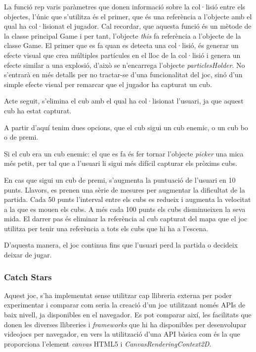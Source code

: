 \documentclass[12pt,a4paper,catalan]{article}
\begin{document}
	La funció rep varis paràmetres que donen informació sobre la col·lisió entre els objectes, l'únic que s'utilitza és el primer, que és una referència a l'objecte amb el qual ha col·lisionat el jugador. Cal recordar, que aquesta funció és un mètode de la classe principal Game i per tant, l'objecte \textit{this} fa referència a l'objecte de la classe Game.
	El primer que es fa quan es detecta una col·lisió, és generar un efecte visual que crea múltiples partícules en el lloc de la col·lisió i genera un efecte similar a una explosió, d'això se n'encarrega l'objecte \textit{particlesHolder}. No s'entrarà en més detalls per no tractar-se d'una funcionalitat del joc, sinó d'un simple efecte visual per remarcar que el jugador ha capturat un cub.
	
	Acte seguit, s'elimina el cub amb el qual ha col·lisionat l'usuari, ja que aquest cub ha estat capturat.
	
	A partir d'aquí tenim dues opcions, que el cub sigui un cub enemic, o un cub bo o de premi.
	
	Si el cub era un cub enemic: el que es fa és fer tornar l'objecte \textit{picker} una mica més petit, per tal que a l'usuari li sigui més difícil capturar els pròxims cubs.
	
	En cas que sigui un cub de premi, s'augmenta la puntuació de l'usuari en 10 punts. Llavors, es prenen una sèrie de mesures per augmentar la dificultat de la partida. Cada 50 punts l'interval entre els cubs es redueix i augmenta la velocitat a la que es mouen els cubs. A més cada 100 punts els cubs disminueixen la seva mida.
	El darrer pas és eliminar la referència al cub capturat del mapa que el joc utilitza per tenir una referència a tots els cubs que hi ha a l'escena.
	
	D'aquesta manera, el joc continua fins que l'usuari perd la partida o decideix deixar de jugar.
	
	\subsubsection{Catch Stars}
	Aquest joc, s'ha implementat sense utilitzar cap llibreria externa per poder experimentar i comparar com seria la creació d'un joc utilitzant només APIs de baix nivell, ja disponibles en el navegador. Es pot comparar així, les facilitats que donen les diverses llibreries i \textit{frameworks} que hi ha disponibles per desenvolupar videojocs per navegador, en vers la utilització d'una API bàsica com és la que proporciona l'element \textit{canvas} HTML5 i \textit{CanvasRenderingContext2D}.
	
\end{document}
